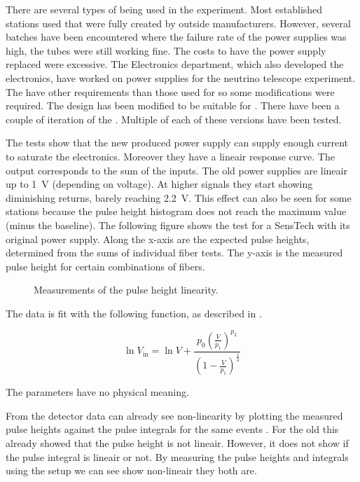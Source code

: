 There are several types of \pmt being used in the \hisparc experiment.
Most established stations used \pmts that were fully created by outside
manufacturers. However, several batches have been encountered where the
failure rate of the \pmt power supplies was high, the tubes were still
working fine. The costs to have the power supply replaced were
excessive. The \nikhef Electronics department, which also developed the
\hisparc electronics, have worked on \pmt power supplies for the \kmnet
neutrino telescope experiment. The \kmnet \pmts have other requirements
than those used for \hisparc so some modifications were required. The
\kmnet design has been modified to be suitable for \hisparc. There have
been a couple of iteration of the \hisparc \pmts. Multiple \pmts of each
of these versions have been tested.

The tests show that the new \nikhef produced \pmt power supply can
supply enough current to saturate the \hisparc electronics. Moreover
they have a lineair response curve. The output corresponds to the sum of
the inputs. The old power supplies are lineair up to \SI{1}{\volt}
(depending on voltage). At higher signals they start showing diminishing
returns, barely reaching \SI{2.2}{\volt}. This effect can also be seen
for some \hisparc stations because the pulse height histogram does not
reach the maximum \adc value (minus the baseline). The following figure
shows the test for a SensTech \pmt with its original power supply. Along
the x-axis are the expected pulse heights, determined from the sums of
individual fiber tests. The y-axis is the measured pulse height for
certain combinations of fibers.

\begin{figure}
    \centering
    
    \caption{Measurements of the pulse height linearity.}
    \label{fig:linearity_senstech_ph}
\end{figure}

The data is fit with the following function, as described in
\cite{icecube:pmt}.

\begin{equation}
    \ln V_{\mathrm{in}} = \ln V +
                          \frac{p_0 \left(\frac{V}{p_1}\right)^{p_2}}
                               {\left(1 - \frac{V}{p_1}\right)^{\frac{1}{4}}}
\end{equation}

The parameters have no physical meaning.


From the detector data can already see non-linearity by plotting the
measured pulse heights against the pulse integrals for the same events
. For the old \pmts this
already showed that the pulse height is not lineair. However, it does
not show if the pulse integral is lineair or not. By measuring the pulse
heights and integrals using the setup we can see show non-lineair they
both are.

